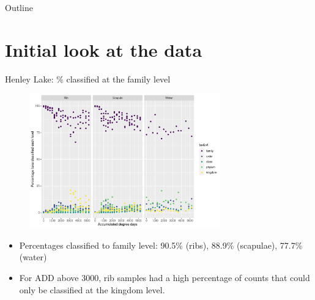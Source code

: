\documentclass{beamer}
\date{Jan.\ 2020}
\begin{document}

\begin{frame}{Outline}
  \tableofcontents
\end{frame}








\section[Initial look]{Initial look at the data}


\begin{frame}{Henley Lake: \% classified at the family level}

  \begin{center}
    \begin{figure}
      \includegraphics[width=3.25in]{HenleyLake/bacteria/family_perc_classif_by_add_type}
    \end{figure}
  \end{center}
  \vspace{-0.1in}
  {\footnotesize
  \begin{itemize}
    \item Percentages classified to family level: 90.5\% (ribs), 88.9\%
    (scapulae), 77.7\% (water)
    \item For ADD above 3000, rib samples had a high percentage of
  counts that could only be classified at the kingdom level.
  \end{itemize}
  }
\end{frame}
\end{document}

